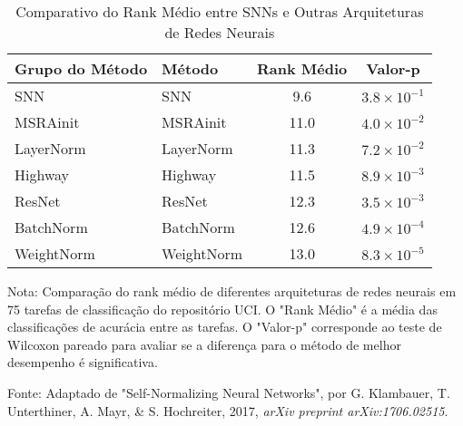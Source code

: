 \begin{table}[ht]
    \centering
    \begin{threeparttable}
        \caption{Comparativo do Rank Médio entre SNNs e Outras Arquiteturas de Redes Neurais}
        \label{tab:comparativo-selu}
        \begin{tabular}{llcc}
            \toprule
            \textbf{Grupo do Método} & \textbf{Método} & \textbf{Rank Médio} & \textbf{Valor-p} \\
            \midrule
            
            SNN & SNN & 9.6 & $3.8 \times 10^{-1}$ \\
            MSRAinit & MSRAinit & 11.0 & $4.0 \times 10^{-2}$ \\
            LayerNorm & LayerNorm & 11.3 & $7.2 \times 10^{-2}$ \\
            Highway & Highway & 11.5 & $8.9 \times 10^{-3}$ \\
            ResNet & ResNet & 12.3 & $3.5 \times 10^{-3}$ \\
            BatchNorm & BatchNorm & 12.6 & $4.9 \times 10^{-4}$ \\
            WeightNorm & WeightNorm & 13.0 & $8.3 \times 10^{-5}$ \\

            \bottomrule
        \end{tabular}
        
        \begin{tablenotes}[para]
            \small
            \item[] Nota: Comparação do rank médio de diferentes arquiteturas de redes neurais em 75 tarefas de classificação do repositório UCI. O "Rank Médio" é a média das classificações de acurácia entre as tarefas. O "Valor-p" corresponde ao teste de Wilcoxon pareado para avaliar se a diferença para o método de melhor desempenho é significativa.
            \item[] Fonte: Adaptado de "Self-Normalizing Neural Networks", por G. Klambauer, T. Unterthiner, A. Mayr, \& S. Hochreiter, 2017, \textit{arXiv preprint arXiv:1706.02515}.
        \end{tablenotes}
        
    \end{threeparttable}
\end{table}

